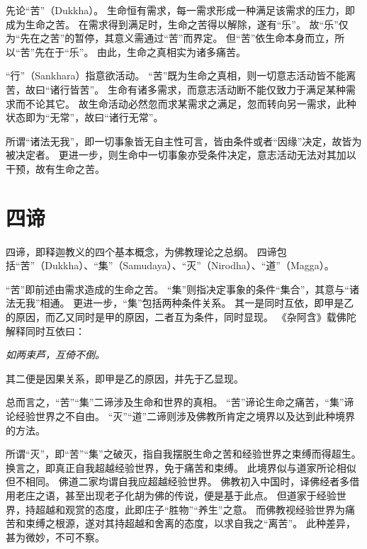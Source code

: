 \documentclass[11pt]{article}
\begin{document}
\par

先论“苦”（Dukkha）。
生命恒有需求，每一需求形成一种满足该需求的压力，即成为生命之苦。
在需求得到满足时，生命之苦得以解除，遂有“乐”。
故“乐”仅为“先在之苦”的暂停，其意义需通过“苦”而界定。
但“苦”依生命本身而立，所以“苦”先在于“乐”。
由此，生命之真相实为诸多痛苦。

\par

“行”（Sankhara）指意欲活动。
“苦”既为生命之真相，则一切意志活动皆不能离苦，故曰“诸行皆苦”。
生命有诸多需求，而意志活动断不能仅致力于满足某种需求而不论其它。
故生命活动必然忽而求某需求之满足，忽而转向另一需求，此种状态即为“无常”，故曰“诸行无常”。

\par

所谓“诸法无我”，即一切事象皆无自主性可言，皆由条件或者“因缘”决定，故皆为被决定者。
更进一步，则生命中一切事象亦受条件决定，意志活动无法对其加以干预，故有生命之苦。

\section{四谛}
四谛，即释迦教义的四个基本概念，为佛教理论之总纲。
四谛包括“苦”（Dukkha）、“集”（Samudaya）、“灭”（Nirodha）、“道”（Magga）。

\par

“苦”即前述由需求造成的生命之苦。
“集”则指决定事象的条件“集合”，其意与“诸法无我”相通。
更进一步，“集”包括两种条件关系。
其一是同时互依，即甲是乙的原因，而乙又同时是甲的原因，二者互为条件，同时显现。
《杂阿含》载佛陀解释同时互依曰：

\textit{如两束芦，互倚不倒。}

其二便是因果关系，即甲是乙的原因，并先于乙显现。

\par

总而言之，“苦”“集”二谛涉及生命和世界的真相。
“苦”谛论生命之痛苦，“集”谛论经验世界之不自由。
“灭”“道”二谛则涉及佛教所肯定之境界以及达到此种境界的方法。

\par

所谓“灭”，即“苦”“集”之破灭，指自我摆脱生命之苦和经验世界之束缚而得超生。
换言之，即真正自我超越经验世界，免于痛苦和束缚。
此境界似与道家所论相似但不相同。
佛道二家均谓自我应超越经验世界。
佛教初入中国时，译佛经者多借用老庄之语，甚至出现老子化胡为佛的传说，便是基于此点。
但道家于经验世界，持超越和观赏的态度，此即庄子“胜物”“养生”之意。
而佛教视经验世界为痛苦和束缚之根源，遂对其持超越和舍离的态度，以求自我之“离苦”。
此种差异，甚为微妙，不可不察。
\end{document}
